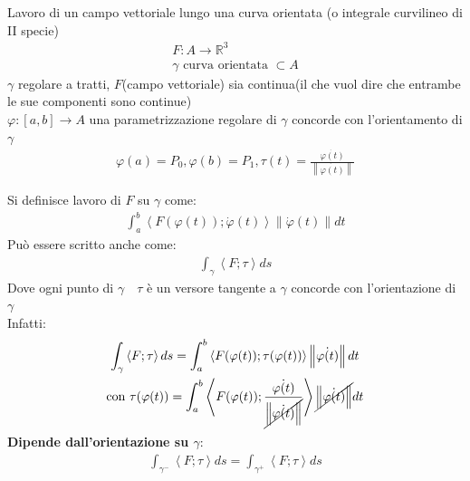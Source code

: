 \documentclass[a4paper, oneside]{article}
\begin{document}
\begin{proposition}
    Lavoro di un campo vettoriale lungo una curva orientata (o integrale curvilineo di II specie)
    \begin{gather*}
        F:A \to \mathbb{R}^3\\
        \gamma \text{ curva orientata } \subset A
    \end{gather*}
     $\gamma$ regolare a tratti, $F$(campo vettoriale) sia continua(il che vuol dire che entrambe le sue componenti sono continue)\\
    $\varphi:[a,b] \to A$ una parametrizzazione regolare di $\gamma$ concorde con l'orientamento di $\gamma$\\
    \begin{gather*}
        \varphi(a) = P_0 , \varphi(b) = P_1, \tau(t) = \frac{\dot{\varphi(t)}}{\left\lVert \dot{\varphi(t)} \right\rVert }
    \end{gather*}
\end{proposition}


\begin{definition}
    Si definisce lavoro di $F$ su $\gamma$ come:
    \begin{gather*}
        \int_{a}^{b} \left\langle F(\varphi(t));\dot{\varphi}(t) \right\rangle \left\lVert \dot{\varphi}(t) \right\rVert dt
    \end{gather*}
    Può essere scritto anche come:
    \begin{gather*}
        \int_{\gamma} \left\langle F;\tau \right\rangle ds 
    \end{gather*}
    Dove ogni punto di $\gamma \quad \tau$ è un versore tangente a $\gamma$ concorde con l'orientazione di $\gamma$ \\
    Infatti:
    \begin{gather*}
        \int_{\gamma} \left\langle F ; \tau\right\rangle ds = \int_{a}^{b} \left\langle F(\varphi(t)); \tau(\varphi(t)) \right\rangle \left\lVert \dot{\varphi(t)} \right\rVert dt\\
        \text{con } \tau(\varphi(t)) = \int_{a}^{b} \left\langle F(\varphi(t)); \frac{\dot{\varphi(t)}}{\cancel{\left\lVert \dot{\varphi(t)} \right\rVert}} \right\rangle \cancel{\left\lVert \dot{\varphi(t)} \right\rVert} dt
    \end{gather*}
    \textbf{Dipende dall'orientazione su $\gamma$}:
    \begin{gather*}
        \int_{\gamma^-} \left\langle F; \tau \right\rangle ds = \int_{\gamma^+} \left\langle F; \tau\right\rangle ds 
    \end{gather*}
\end{definition}
\end{document}
